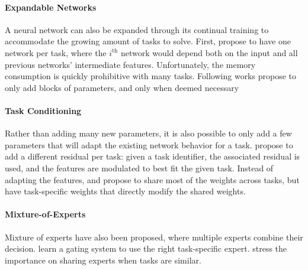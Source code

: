 \paragraph{Expandable Networks} A neural network can also be expanded through its continual
training to accommodate the growing amount of tasks to solve. First, \cite{rusu2016progressive}
propose to have one network per task, where the $i^{\text{th}}$ network would depend both on the
input and all previous networks' intermediate features. Unfortunately, the memory consumption is
quickly prohibitive with many tasks. Following works propose to only add blocks of parameters,
and only when deemed necessary



\paragraph{Task Conditioning} Rather than adding many new parameters, it is also possible to only
add a few parameters that will adapt the existing network behavior for a task.
\cite{rebuffi2017visualadapters} propose to add a different residual per task: given a task
identifier, the associated residual is used, and the features are modulated to best fit the given
task. Instead of adapting the features, \cite{wen2020batchensemble} and \cite{sun2019metatransfer}
propose to share most of the weights across tasks, but have task-specific weights that directly
modify the shared weights.

\paragraph{Mixture-of-Experts} Mixture of experts \citep{masoudnia2014mixture} have also been
proposed, where multiple experts combine their decision. \cite{aljundi2017experts} learn a gating
system to use the right task-specific expert. \cite{collier2020routingnetwork} stress the importance
on sharing experts when tasks are similar.

